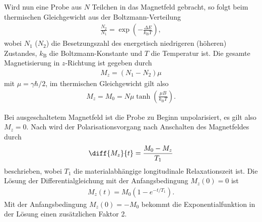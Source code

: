 Wird nun eine Probe aus $N$ Teilchen in das Magnetfeld gebracht, so folgt beim thermischen Gleichgewicht aus der Boltzmann-Verteilung
\begin{align*}
  \frac{N_2}{N_1}=\exp \left( -\frac{\Delta E}{k_\mathrm{B}T} \right),
\end{align*}
wobei $N_1$ ($N_2$) die Besetzungszahl des energetisch niedrigeren (höheren) Zustandes, $k_\mathrm{B}$ die Boltzmann-Konstante und $T$ die Temperatur ist. Die gesamte Magnetisierung in $z$-Richtung ist gegeben durch 
\begin{align*}
  M_z=(N_1-N_2)\mu
\end{align*} 
mit $\mu=\gamma\hbar/2$, im thermischen Gleichgewicht gilt also
\begin{align*}
  M_z=M_0=N\mu\tanh \left(  \frac{\mu B}{k_\mathrm{B}T}\right).
\end{align*}

Bei ausgeschaltetem Magnetfeld ist die Probe zu Beginn unpolarisiert, es gilt also $M_z=0$. Nach \cite{manual} wird der Polarisationsvorgang nach Anschalten des Magnetfeldes durch 
\begin{align*}
  \diff{M_z}{t}=\frac{M_0-M_z}{T_1}
\end{align*}
beschrieben, wobei $T_1$ die materialabhängige longitudinale Relaxationszeit ist. Die Lösung der Differentialgleichung mit der Anfangsbedingung $M_z(0)=0$ ist
\begin{align}
  M_z(t)=M_0\left( 1-e^{-t/T_1} \right).
\end{align}
Mit der Anfangsbedingung $M_z(0)=-M_0$ bekommt die Exponentialfunktion in der Lösung einen zusätzlichen Faktor 2.

